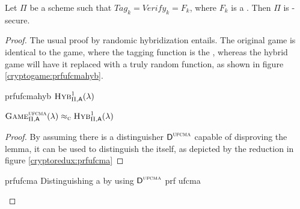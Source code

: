 \begin{theorem}
    Let $\Pi$ be a \mac{} scheme such that $\textit{Tag}_k = \textit{Verify}_k = F_k$, where $F_k$ is a \prf. Then $\Pi$ is \ufcma-secure.
\end{theorem}

\begin{proof}
    The usual proof by randomic hybridization entails. The original game is identical to the \ufcma{} game, where the tagging function is the \prf, whereas the hybrid game will have it replaced with a truly random function, as shown in figure \ref{cryptogame:prfufcmahyb}.

    \begin{cryptogame}
        {prfufcmahyb}
        {$\hybridg{1}(\lambda)$}
        {}


        \cseqbeginloop
        \cseqendloop

        \cseqdelay


    \end{cryptogame}

    \begin{lemma}
        $\cryptog{ufcma}(\lambda) \compindist \hybridg{1}(\lambda)$  
    \end{lemma}

    \begin{proof}
        By assuming there is a distinguisher $\textsf{D}^{\textsc{ufcma}}$ capable of disproving the lemma, it can be used to distinguish the \prf{} itself, as depicted by the reduction in figure \ref{cryptoredux:prfufcma}
    \end{proof}

    \begin{cryptoredux}
        {prfufcma}
        {Distinguishing a \prf{} by using $\textsf{D}^{\textsc{ufcma}}$}
        {prf}
        {ufcma}

    

\end{cryptoredux}
\end{proof}
